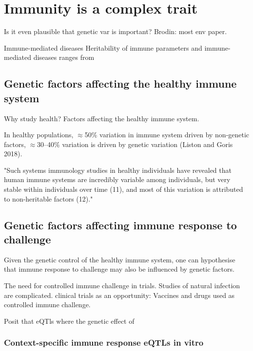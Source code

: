 \section{Immunity is a complex trait}

Is it even plausible that genetic var is important?
Brodin: most env paper.

Immune-mediated diseases
Heritability of immune parameters and immune-mediated diseases
    ranges from 

\subsection{Genetic factors affecting the healthy immune system}

Why study health?
Factors affecting the healthy immune system.

In healthy populations, $\approx$50\% variation in immune system driven by non-genetic factors, $\approx$30–40\% variation is driven by genetic variation (Liston and Goris 2018).

"Such systems  immunology studies in  healthy individuals have  revealed that human immune  systems are incredibly  variable among individuals,  but very stable within  individuals over time (11),  and most of this variation is  attributed to non-heritable  factors (12)."

\subsection{Genetic factors affecting immune response to challenge}

Given the genetic control of the healthy immune system, one can hypothesise that immune response to challenge may also be influenced by genetic factors.

The need for controlled immune challenge in trials.
Studies of natural infection are complicated.
clinical trials as an opportunity: 
    Vaccines and drugs used as controlled immune challenge.

Posit that eQTls where the genetic effect of 

\subsubsection{Context-specific immune response eQTLs in vitro}


